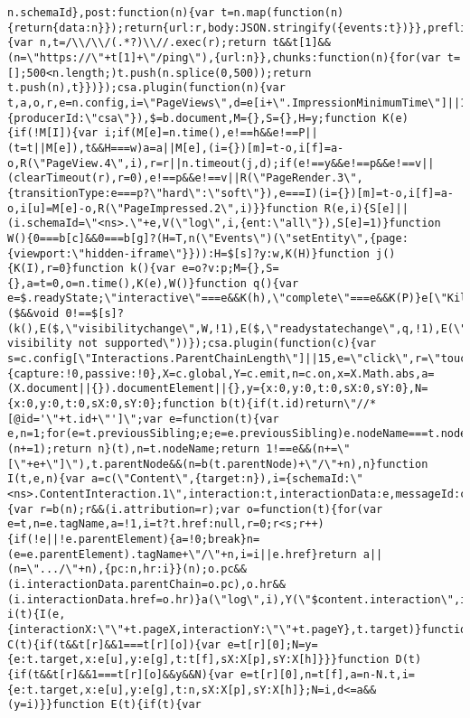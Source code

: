 \documentclass[
]{article}
\begin{document}
\begin{verbatim}
n.schemaId},post:function(n){var t=n.map(function(n){return{data:n}});return{url:r,body:JSON.stringify({events:t})}},preflight:function(){var n,t=/\\/\\/(.*?)\\//.exec(r);return t&&t[1]&&(n=\"https://\"+t[1]+\"/ping\"),{url:n}},chunks:function(n){for(var t=[];500<n.length;)t.push(n.splice(0,500));return t.push(n),t}})});csa.plugin(function(n){var t,a,o,r,e=n.config,i=\"PageViews\",d=e[i+\".ImpressionMinimumTime\"]||1e3,s=\"hidden\",c=\"innerHeight\",g=\"innerWidth\",l=\"renderedTo\",f=l+\"Viewed\",m=l+\"Meaningful\",u=l+\"Impressed\",p=1,v=2,h=3,w=4,y=5,P=\"loaded\",I=7,T=8,b=n.global,E=n.on,V=n(\"Events\",{producerId:\"csa\"}),$=b.document,M={},S={},H=y;function K(e){if(!M[I]){var i;if(M[e]=n.time(),e!==h&&e!==P||(t=t||M[e]),t&&H===w)a=a||M[e],(i={})[m]=t-o,i[f]=a-o,R(\"PageView.4\",i),r=r||n.timeout(j,d);if(e!==y&&e!==p&&e!==v||(clearTimeout(r),r=0),e!==p&&e!==v||R(\"PageRender.3\",{transitionType:e===p?\"hard\":\"soft\"}),e===I)(i={})[m]=t-o,i[f]=a-o,i[u]=M[e]-o,R(\"PageImpressed.2\",i)}}function R(e,i){S[e]||(i.schemaId=\"<ns>.\"+e,V(\"log\",i,{ent:\"all\"}),S[e]=1)}function W(){0===b[c]&&0===b[g]?(H=T,n(\"Events\")(\"setEntity\",{page:{viewport:\"hidden-iframe\"}})):H=$[s]?y:w,K(H)}function j(){K(I),r=0}function k(){var e=o?v:p;M={},S={},a=t=0,o=n.time(),K(e),W()}function q(){var e=$.readyState;\"interactive\"===e&&K(h),\"complete\"===e&&K(P)}e[\"KillSwitch.\"+i]||($&&void 0!==$[s]?(k(),E($,\"visibilitychange\",W,!1),E($,\"readystatechange\",q,!1),E(\"$afterPageTransition\",k),E(\"$timing:loaded\",q),n.once(\"$load\",q)):n.warn(\"Page visibility not supported\"))});csa.plugin(function(c){var s=c.config[\"Interactions.ParentChainLength\"]||15,e=\"click\",r=\"touches\",f=\"timeStamp\",o=\"length\",u=\"pageX\",g=\"pageY\",p=\"pageXOffset\",h=\"pageYOffset\",m=250,v=5,d=200,l=.5,t={capture:!0,passive:!0},X=c.global,Y=c.emit,n=c.on,x=X.Math.abs,a=(X.document||{}).documentElement||{},y={x:0,y:0,t:0,sX:0,sY:0},N={x:0,y:0,t:0,sX:0,sY:0};function b(t){if(t.id)return\"//*[@id='\"+t.id+\"']\";var e=function(t){var e,n=1;for(e=t.previousSibling;e;e=e.previousSibling)e.nodeName===t.nodeName&&(n+=1);return n}(t),n=t.nodeName;return 1!==e&&(n+=\"[\"+e+\"]\"),t.parentNode&&(n=b(t.parentNode)+\"/\"+n),n}function I(t,e,n){var a=c(\"Content\",{target:n}),i={schemaId:\"<ns>.ContentInteraction.1\",interaction:t,interactionData:e,messageId:c.UUID()};if(n){var r=b(n);r&&(i.attribution=r);var o=function(t){for(var e=t,n=e.tagName,a=!1,i=t?t.href:null,r=0;r<s;r++){if(!e||!e.parentElement){a=!0;break}n=(e=e.parentElement).tagName+\"/\"+n,i=i||e.href}return a||(n=\".../\"+n),{pc:n,hr:i}}(n);o.pc&&(i.interactionData.parentChain=o.pc),o.hr&&(i.interactionData.href=o.hr)}a(\"log\",i),Y(\"$content.interaction\",i)}function i(t){I(e,{interactionX:\"\"+t.pageX,interactionY:\"\"+t.pageY},t.target)}function C(t){if(t&&t[r]&&1===t[r][o]){var e=t[r][0];N=y={e:t.target,x:e[u],y:e[g],t:t[f],sX:X[p],sY:X[h]}}}function D(t){if(t&&t[r]&&1===t[r][o]&&y&&N){var e=t[r][0],n=t[f],a=n-N.t,i={e:t.target,x:e[u],y:e[g],t:n,sX:X[p],sY:X[h]};N=i,d<=a&&(y=i)}}function E(t){if(t){var 
\end{verbatim}
\end{document}
